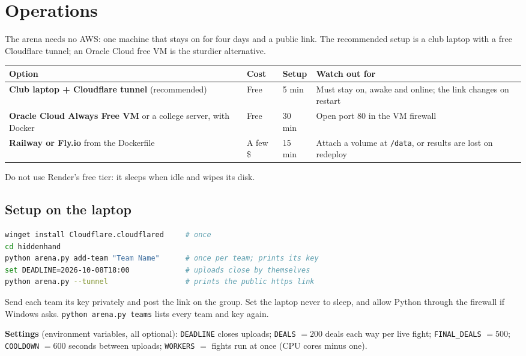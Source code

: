 \documentclass[11pt,a4paper]{article}
\newcommand{\code}[1]{\texttt{#1}}
\begin{document}
\section{Operations}

The arena needs no AWS: one machine that stays on for four days and a public link. The
recommended setup is a club laptop with a free Cloudflare tunnel; an Oracle Cloud free VM is
the sturdier alternative.

\begin{center}
\begin{tabularx}{\linewidth}{@{}L l l L@{}}
\toprule
\textbf{Option} & \textbf{Cost} & \textbf{Setup} & \textbf{Watch out for} \\
\midrule
\textbf{Club laptop + Cloudflare tunnel} (recommended) & Free & 5 min & Must stay on, awake and
  online; the link changes on restart \\
\textbf{Oracle Cloud Always Free VM} or a college server, with Docker & Free & 30 min & Open
  port 80 in the VM firewall \\
\textbf{Railway or Fly.io} from the Dockerfile & A few \$ & 15 min & Attach a volume at
  \code{/data}, or results are lost on redeploy \\
\bottomrule
\end{tabularx}
\end{center}

Do not use Render's free tier: it sleeps when idle and wipes its disk.

\subsection{Setup on the laptop}

\begin{lstlisting}[language=bash]
winget install Cloudflare.cloudflared     # once
cd hiddenhand
python arena.py add-team "Team Name"      # once per team; prints its key
set DEADLINE=2026-10-08T18:00             # uploads close by themselves
python arena.py --tunnel                  # prints the public https link
\end{lstlisting}

Send each team its key privately and post the link on the group. Set the laptop never to sleep,
and allow Python through the firewall if Windows asks. \code{python arena.py teams} lists every
team and key again.

\textbf{Settings} (environment variables, all optional): \code{DEADLINE} closes uploads;
\code{DEALS} $=200$ deals each way per live fight; \code{FINAL\_DEALS} $=500$;
\code{COOLDOWN} $=600$ seconds between uploads; \code{WORKERS} $=$ fights run at once (CPU
cores minus one).
\end{document}
